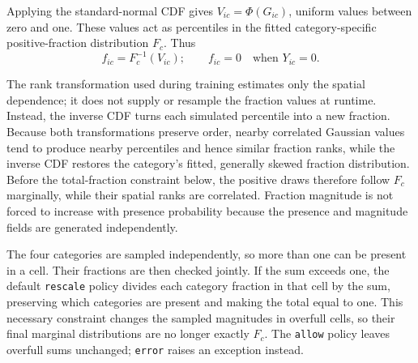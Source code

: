 \documentclass[11pt,a4paper]{article}
\begin{document}
Applying the standard-normal CDF gives $V_{ic}=\Phi(G_{ic})$, uniform values
between zero and one. These values act as percentiles in the fitted
category-specific positive-fraction distribution $F_c$. Thus
\[
 f_{ic}=F_c^{-1}(V_{ic});
 \qquad f_{ic}=0\quad\text{when }Y_{ic}=0.
\]

The rank transformation used during training estimates only the spatial
dependence; it does not supply or resample the fraction values at runtime.
Instead, the inverse CDF turns each simulated percentile into a new fraction.
Because both transformations preserve order, nearby correlated Gaussian values
tend to produce nearby percentiles and hence similar fraction ranks, while the
inverse CDF restores the category's fitted, generally skewed fraction
distribution. Before the total-fraction constraint below, the positive draws
therefore follow $F_c$ marginally, while their spatial ranks are correlated.
Fraction magnitude is not forced to increase with presence probability because
the presence and magnitude fields are generated independently.

The four categories are sampled independently, so more than one can be present
in a cell. Their fractions are then checked jointly. If the sum exceeds one,
the default \texttt{rescale} policy divides each category fraction in that cell
by the sum, preserving which categories are present and making the total equal
to one. This necessary constraint changes the sampled magnitudes in overfull
cells, so their final marginal distributions are no longer exactly $F_c$. The
\texttt{allow} policy leaves overfull sums unchanged; \texttt{error} raises an
exception instead.
\end{document}
